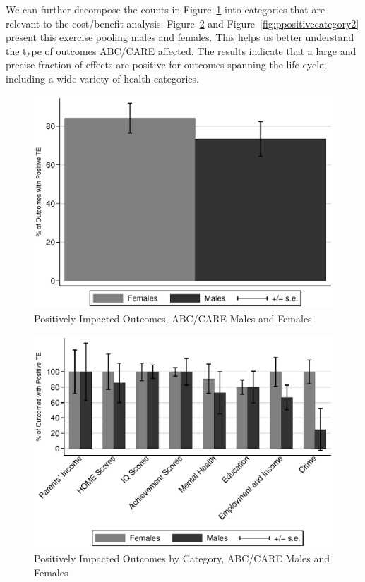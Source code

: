 We can further decompose the counts in Figure~\ref{fig:ppositive} into categories that are relevant to the cost/benefit analysis. Figure~\ref{fig:ppositivecategory1} and Figure~\ref{fig:ppositivecategory2} present this exercise pooling males and females. This helps us better understand the type of outcomes ABC/CARE affected. The results indicate that a large and precise fraction of effects are positive for outcomes spanning the life cycle, including a wide variety of health categories.

\begin{figure}[H]
		\caption{Positively Impacted Outcomes, ABC/CARE Males and Females} \label{fig:ppositive}
		\includegraphics[width=.7\columnwidth]{output/itt_noctrl_all.eps}
\end{figure}

\begin{figure}[H]
		\caption{Positively Impacted Outcomes by Category, ABC/CARE Males and Females} \label{fig:ppositivecategory1}
		\includegraphics[width=.65\columnwidth]{output/itt_noctrl_cats1.eps}
\end{figure}

